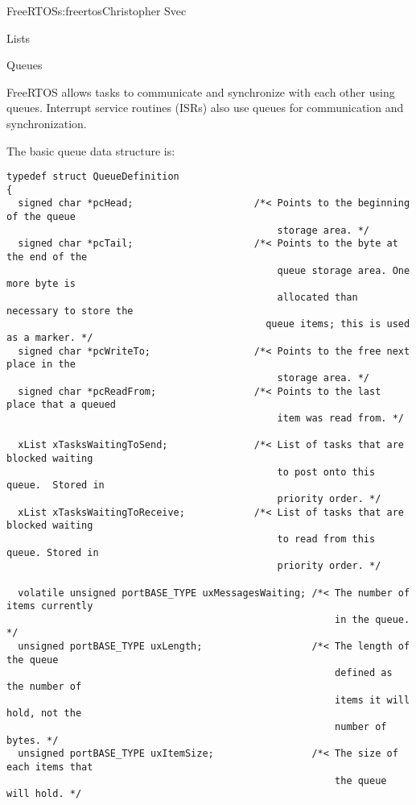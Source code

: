 \begin{aosachapter}{FreeRTOS}{s:freertos}{Christopher Svec}
\begin{aosasect1}{Lists}

\end{aosasect1}

\begin{aosasect1}{Queues}

FreeRTOS allows tasks to communicate and synchronize with each other
using queues.  Interrupt service routines (ISRs) also use queues for
communication and synchronization.

The basic queue data structure is:

\begin{verbatim}
typedef struct QueueDefinition
{
  signed char *pcHead;                     /*< Points to the beginning of the queue 
                                               storage area. */
  signed char *pcTail;                     /*< Points to the byte at the end of the 
                                               queue storage area. One more byte is 
                                               allocated than necessary to store the 
                                             queue items; this is used as a marker. */
  signed char *pcWriteTo;                  /*< Points to the free next place in the 
                                               storage area. */
  signed char *pcReadFrom;                 /*< Points to the last place that a queued 
                                               item was read from. */
                                           
  xList xTasksWaitingToSend;               /*< List of tasks that are blocked waiting 
                                               to post onto this queue.  Stored in 
                                               priority order. */
  xList xTasksWaitingToReceive;            /*< List of tasks that are blocked waiting 
                                               to read from this queue. Stored in 
                                               priority order. */

  volatile unsigned portBASE_TYPE uxMessagesWaiting; /*< The number of items currently
                                                         in the queue. */
  unsigned portBASE_TYPE uxLength;                   /*< The length of the queue 
                                                         defined as the number of 
                                                         items it will hold, not the 
                                                         number of bytes. */
  unsigned portBASE_TYPE uxItemSize;                 /*< The size of each items that 
                                                         the queue will hold. */
                                         

\end{verbatim}
\end{aosasect1}
\end{aosachapter}
